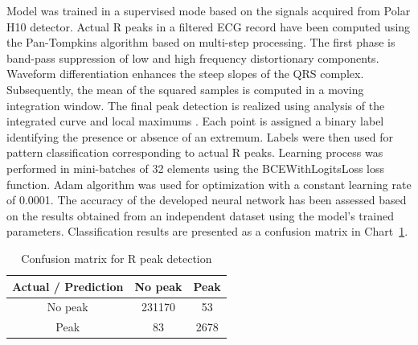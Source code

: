 \documentclass[journal]{IEEEtran}
\begin{document}
Model was trained in a supervised mode based on the signals acquired from Polar H10 detector. Actual R peaks in a filtered ECG record have been computed using the Pan-Tompkins algorithm based on multi-step processing. The first phase is band-pass suppression of low and high frequency distortionary components. Waveform differentiation enhances the steep slopes of the QRS complex. Subsequently, the mean of the squared samples is computed in a moving integration window. The final peak detection is realized using analysis of the integrated curve and local maximums \cite{27}.
Each point is assigned a binary label identifying the presence or absence of an extremum. Labels were then used for pattern classification corresponding to actual R peaks.
\newpage
Learning process was performed in mini-batches of 32 elements using the BCEWithLogitsLoss loss function. Adam algorithm was used for optimization with a constant learning rate of 0.0001. The accuracy of the developed neural network has been assessed based on the results obtained from an independent dataset using the model's trained parameters. Classification results are presented as a confusion matrix in Chart~\ref{tab:conf_matrix}.


\begin{table}[ht]
\centering
\caption{Confusion matrix for R peak detection}
\label{tab:conf_matrix}
\begin{tabular}{|c|c|c|}
\hline
\textbf{Actual / Prediction} & \textbf{No peak } & \textbf{Peak } \\
\hline
No peak  & 231170 & 53 \\
Peak  & 83 & 2678 \\
\hline
\end{tabular}
\end{table}
\end{document}
